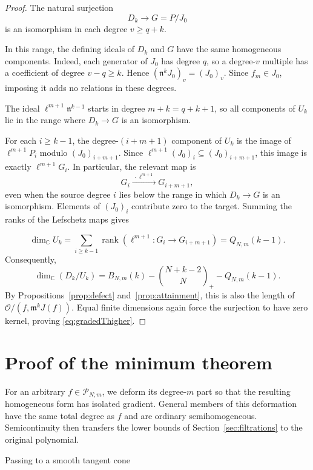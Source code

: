 \documentclass[12pt,reqno]{amsart}
\makeatletter
\renewcommand\subsection{\@startsection{subsection}{2}%
  \z@{.8\linespacing\@plus.3\linespacing}{.35\linespacing}%
  {\normalfont\bfseries}}
\newcommand{\C}{\mathbb C}
\newcommand{\mm}{\mathfrak m}
\newcommand{\rank}{\operatorname{rank}}
\newcommand{\tbin}[2]{\binom{#1}{#2}_{\!+}}
\newcommand{\Pall}{\mathcal P_{N;m}}
\newcommand{\OO}{\mathcal O}
\theoremstyle{definition}
\makeatother
\begin{document}
\begin{proof}
The natural surjection
\[
 D_k\longrightarrow G=P/J_0
\]
is an isomorphism in each degree $v\geq q+k$.

In this range, the defining ideals of $D_k$ and $G$ have the same
homogeneous components. Indeed, each generator of $J_0$ has degree
$q$, so a degree-$v$ multiple has a coefficient of degree
$v-q\geq k$. Hence $(\mathfrak n^kJ_0)_v=(J_0)_v$.
Since $f_m\in J_0$, imposing it adds no relations in these degrees.

The ideal $\ell^{m+1}\mathfrak n^{k-1}$ starts in degree
$m+k=q+k+1$, so all components of $U_k$ lie in the range
where $D_k\to G$ is an isomorphism.


For each $i\geq k-1$, the degree-$(i+m+1)$ component of $U_k$ is
the image of $\ell^{m+1}P_i$ modulo $(J_0)_{i+m+1}$. Since
$\ell^{m+1}(J_0)_i\subseteq(J_0)_{i+m+1}$, this image is exactly
$\ell^{m+1}G_i$. In particular, the relevant map is
\[
 G_i\xrightarrow{\ \cdot\ell^{m+1}\ }G_{i+m+1},
\]
even when the source degree $i$ lies below the range in which
$D_k\to G$ is an isomorphism. Elements of $(J_0)_i$ contribute
zero to the target. Summing the ranks of the Lefschetz maps gives

\[
 \dim_\C U_k
 =\sum_{i\geq k-1}\rank(\ell^{m+1}:G_i\to G_{i+m+1})=Q_{N,m}(k-1).
\]
Consequently,
\[
 \dim_\C(D_k/U_k)
 =B_{N,m}(k)-\tbin{N+k-2}{N}-Q_{N,m}(k-1).
\]
By Propositions~\ref{prop:defect} and~\ref{prop:attainment}, this
is also the length of $\OO/(f,\mm^kJ(f))$. Equal finite dimensions
again force the surjection to have zero kernel, proving
\eqref{eq:gradedThigher}.
\end{proof}


\section{Proof of the minimum theorem}
\label{sec:fullclass}

 
For an arbitrary $f\in\Pall$, we deform its degree-$m$ part so that
the resulting homogeneous form has isolated gradient. General members
of this deformation have the same total degree as $f$ and are ordinary
semihomogeneous. Semicontinuity then transfers the lower bounds of
Section~\ref{sec:filtrations} to the original polynomial.

\subsection{Passing to a smooth tangent cone}
\end{document}
